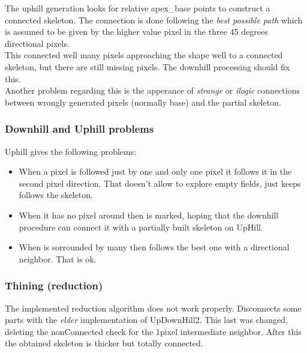 \documentclass{article}
\begin{document}
The uphill generation looks for relative apex\_base points to construct a connected
skeleton. The connection is done following the \emph{best possible path} which is 
assumed to be given by the higher value pixel in the three 45 degrees directional pixels.\\
This connected well many pixels approaching the shape well to a connected skeleton, but there
are still missing pixels. The downhill processing should fix this.\\

Another problem regarding this is the apperance of \emph{strange} or \emph{ilogic} connections
between wrongly generated pixels (normally base) and the partial skeleton.\\

\subsubsection{Downhill and Uphill problems}
Uphill gives the following problems: 
\begin{itemize}
\item When a pixel is followed just by one and only one pixel it follows
it in the second pixel direction. That doesn't allow to explore empty
fields, just keeps follows the skeleton. 

\item When it has no pixel around then is marked, hoping that the downhill
procedure can connect it with a partially built skeleton on UpHill.

\item When is sorrounded by many then follows the best one with a directional
neighbor. That is ok.


\end{itemize}

\subsubsection{Thining (reduction)}
The implemented reduction algorithm does not work properly. Disconnects
some parts with the \emph{elder} implementation of UpDownHill2. This
last was changed, deleting the nonConnected check for the 1pixel intermediate
neighbor. After this the obtained skeleton is thicker but totally connected.\\
\end{document}

